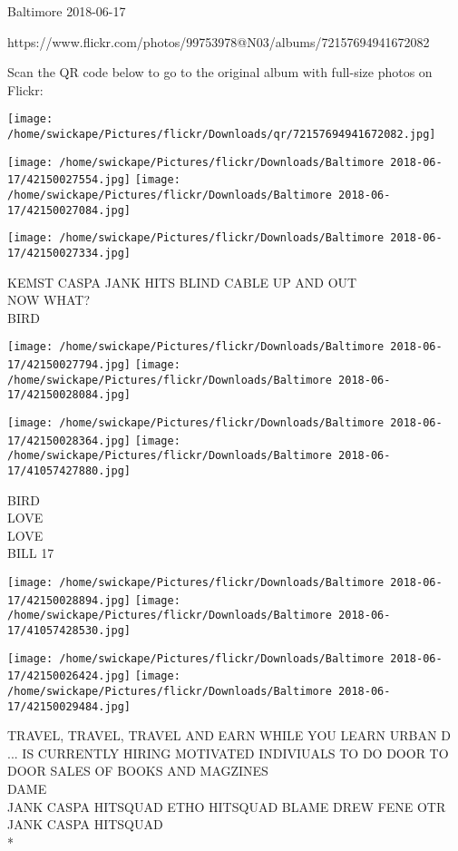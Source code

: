 \documentclass[10pt,letterpaper]{article}
\begin{document}
Baltimore 2018-06-17

https://www.flickr.com/photos/99753978@N03/albums/72157694941672082

Scan the QR code below to go to the original album with full-size photos on Flickr:

\texttt{[image: /home/swickape/Pictures/flickr/Downloads/qr/72157694941672082.jpg]}
\pagebreak

\texttt{[image: /home/swickape/Pictures/flickr/Downloads/Baltimore 2018-06-17/42150027554.jpg]}
\texttt{[image: /home/swickape/Pictures/flickr/Downloads/Baltimore 2018-06-17/42150027084.jpg]}

\vspace{0.25in}
\texttt{[image: /home/swickape/Pictures/flickr/Downloads/Baltimore 2018-06-17/42150027334.jpg]}

KEMST CASPA JANK HITS BLIND CABLE UP AND OUT\\
NOW WHAT?\\
BIRD
\pagebreak

\texttt{[image: /home/swickape/Pictures/flickr/Downloads/Baltimore 2018-06-17/42150027794.jpg]}
\texttt{[image: /home/swickape/Pictures/flickr/Downloads/Baltimore 2018-06-17/42150028084.jpg]}

\texttt{[image: /home/swickape/Pictures/flickr/Downloads/Baltimore 2018-06-17/42150028364.jpg]}
\texttt{[image: /home/swickape/Pictures/flickr/Downloads/Baltimore 2018-06-17/41057427880.jpg]}

BIRD\\
LOVE\\
LOVE\\
BILL 17
\pagebreak

\texttt{[image: /home/swickape/Pictures/flickr/Downloads/Baltimore 2018-06-17/42150028894.jpg]}
\texttt{[image: /home/swickape/Pictures/flickr/Downloads/Baltimore 2018-06-17/41057428530.jpg]}

\texttt{[image: /home/swickape/Pictures/flickr/Downloads/Baltimore 2018-06-17/42150026424.jpg]}
\texttt{[image: /home/swickape/Pictures/flickr/Downloads/Baltimore 2018-06-17/42150029484.jpg]}

TRAVEL, TRAVEL, TRAVEL AND EARN WHILE YOU LEARN URBAN D ... IS CURRENTLY HIRING MOTIVATED INDIVIUALS TO DO DOOR TO DOOR SALES OF BOOKS AND MAGZINES\\
DAME\\
JANK CASPA HITSQUAD ETHO HITSQUAD BLAME DREW FENE OTR JANK CASPA HITSQUAD\\
*
\pagebreak
\end{document}
